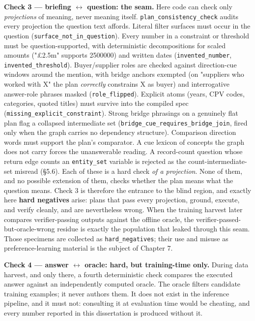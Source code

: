 \documentclass[10pt]{article} %
\begin{document}
\textbf{Check 3 --- briefing $\leftrightarrow$ question: the seam.} Here code can check only \emph{projections} of meaning, never meaning itself. \texttt{plan\_consistency\_check} audits every projection the question text affords. Literal filter surfaces must occur in the question (\texttt{surface\_not\_in\_question}). Every number in a constraint or threshold must be question-supported, with deterministic decompositions for scaled amounts ("\pounds{}2.5m" supports 2500000) and written dates (\texttt{invented\_number}, \texttt{invented\_threshold}). Buyer/supplier roles are checked against direction-cue windows around the mention, with bridge anchors exempted (on "suppliers who worked with X" the plan \emph{correctly} constrains X as buyer) and interrogative answer-role phrases masked (\texttt{role\_flipped}). Explicit atoms (years, CPV codes, categories, quoted titles) must survive into the compiled spec (\texttt{missing\_explicit\_constraint}). Strong bridge phrasings on a genuinely flat plan flag a collapsed intermediate set (\texttt{bridge\_cue\_requires\_bridge\_join}, fired only when the graph carries no dependency structure). Comparison direction words must support the plan's comparator. A cue lexicon of concepts the graph does not carry forces the unanswerable reading. A record-count question whose return edge counts an \texttt{entity\_set} variable is rejected as the count-intermediate-set misread (\S5.6). Each of these is a hard check \emph{of a projection}. None of them, and no possible extension of them, checks whether the plan means what the question means. Check 3 is therefore the entrance to the blind region, and exactly here \textbf{hard negatives} arise: plans that pass every projection, ground, execute, and verify cleanly, and are nevertheless wrong. When the training harvest later compares verifier-passing outputs against the offline oracle, the verifier-passed-but-oracle-wrong residue is exactly the population that leaked through this seam. Those specimens are collected as \texttt{hard\_negatives}; their use and misuse as preference-learning material is the subject of Chapter 7.

\textbf{Check 4 --- answer $\leftrightarrow$ oracle: hard, but training-time only.} During data harvest, and only there, a fourth deterministic check compares the executed answer against an independently computed oracle. The oracle filters candidate training examples; it never authors them. It does not exist in the inference pipeline, and it must not: consulting it at evaluation time would be cheating, and every number reported in this dissertation is produced without it.
\end{document}
